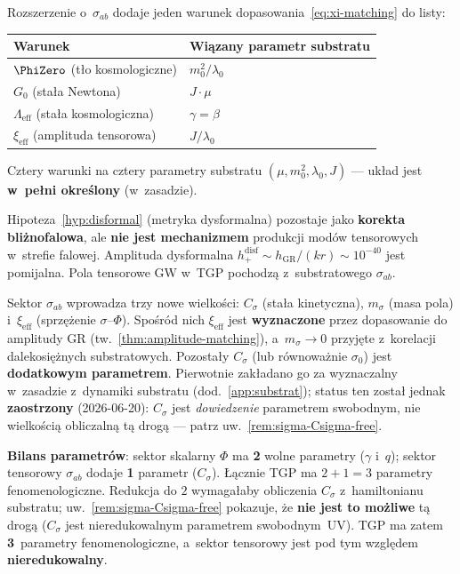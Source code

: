 \begin{remark}\label{rem:param-counting}
Rozszerzenie o~$\sigma_{ab}$ dodaje jeden warunek
dopasowania~\eqref{eq:xi-matching} do listy:
\begin{center}\small
\begin{tabular}{@{}ll@{}}
\toprule
\textbf{Warunek} & \textbf{Wi\k{a}zany parametr substratu} \\
\midrule
$\PhiZero$ (t\l{}o kosmologiczne) & $m_0^2/\lambda_0$ \\
$G_0$ (sta\l{}a Newtona) & $J\cdot\mu$ \\
$\Lambda_{\mathrm{eff}}$ (sta\l{}a kosmologiczna) & $\gamma = \beta$ \\
$\xi_{\mathrm{eff}}$ (amplituda tensorowa) & $J/\lambda_0$ \\
\bottomrule
\end{tabular}
\end{center}
Cztery warunki na cztery parametry substratu
$(\mu, m_0^2, \lambda_0, J)$ --- uk\l{}ad jest
\textbf{w~pe\l{}ni okre\'slony} (w~zasadzie).
\end{remark}

\begin{remark}\label{rem:disformal-status}
Hipoteza~\ref{hyp:disformal} (metryka dysformalna)
pozostaje jako \textbf{korekta bli\.znofalowa},
ale \textbf{nie jest mechanizmem} produkcji mod\'ow
tensorowych w~strefie falowej.
Amplituda dysformalna
$h^{\mathrm{disf}}_+ \sim h_{\mathrm{GR}}/(kr)
\sim 10^{-40}$ jest pomijalna.
Pola tensorowe GW w~TGP pochodz\k{a}
z~substratowego $\sigma_{ab}$.
\end{remark}

\begin{remark}%
\label{rem:sigma-params}
Sektor $\sigma_{ab}$ wprowadza trzy nowe wielko\'sci:
$C_\sigma$ (sta\l{}a kinetyczna), $m_\sigma$ (masa pola)
i~$\xi_{\mathrm{eff}}$ (sprz\k{e}\.zenie $\sigma$--$\Phi$).
Spo\'sr\'od nich $\xi_{\mathrm{eff}}$ jest \textbf{wyznaczone}
przez dopasowanie do amplitudy GR
(tw.~\ref{thm:amplitude-matching}), a~$m_\sigma \to 0$
przyj\k{e}te z~korelacji dalekosi\k{e}\.znych substratowych.
Pozosta\l{}y $C_\sigma$ (lub r\'ownowa\.znie $\sigma_0$)
jest \textbf{dodatkowym parametrem}. Pierwotnie zak\l{}adano go za
wyznaczalny w~zasadzie z~dynamiki substratu (dod.~\ref{app:substrat});
status ten zosta\l{} jednak \textbf{zaostrzony} (2026-06-20):
$C_\sigma$ jest \emph{dowiedzenie} parametrem swobodnym, nie
wielko\'sci\k{a} obliczaln\k{a} t\k{a} drog\k{a} ---
patrz uw.~\ref{rem:sigma-Csigma-free}.

\medskip\noindent
\textbf{Bilans parametr\'ow}: sektor skalarny $\Phi$ ma
\textbf{2} wolne parametry ($\gamma$ i~$q$);
sektor tensorowy $\sigma_{ab}$ dodaje \textbf{1} parametr
($C_\sigma$). \L{}\k{a}cznie TGP ma $2+1 = 3$ parametry
fenomenologiczne. Redukcja do $2$ wymaga\l{}aby obliczenia
$C_\sigma$ z~hamiltonianu substratu; uw.~\ref{rem:sigma-Csigma-free}
pokazuje, \.ze \textbf{nie jest to mo\.zliwe} t\k{a} drog\k{a}
($C_\sigma$ jest nieredukowalnym parametrem swobodnym~UV).
TGP ma zatem \textbf{3}~parametry fenomenologiczne, a~sektor
tensorowy jest pod tym wzgl\k{e}dem \textbf{nieredukowalny}.
\end{remark}

